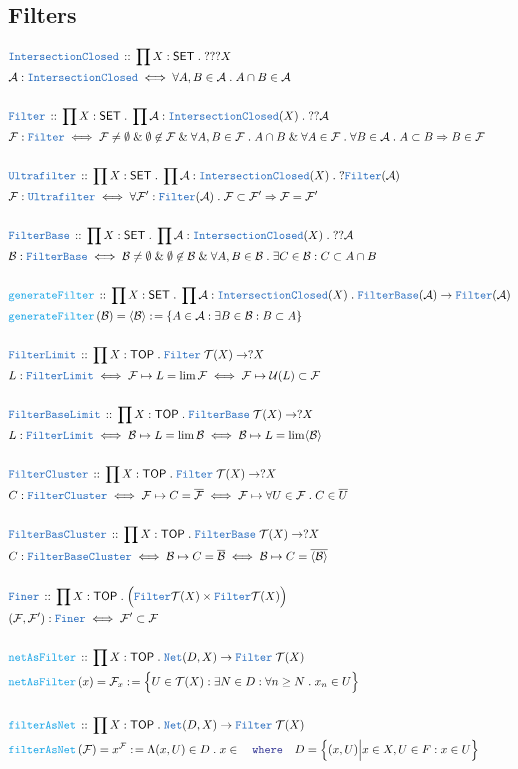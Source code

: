 \documentclass[12pt]{scrartcl}
\newcommand{\TYPE}[1]{\textcolor{NavyBlue}{\mathtt{#1}}}
\newcommand{\FUNC}[1]{\textcolor{Cerulean}{\mathtt{#1}}}
\newcommand{\LOGIC}[1]{\textcolor{Blue}{\mathtt{#1}}}
\renewcommand{\.}{\; . \;}
\newcommand{\de}{: \kern 0.1pc =}
\newcommand{\where}{\LOGIC{where}}
\newcommand{\Act}[1]{\left( #1 \right)}
\newcommand{\DeclareType}[2]{& \TYPE{#1} \, :: \, #2 \\}
\newcommand{\DefineType}[3]{& #1 : \TYPE{#2} \iff #3 \\}
\newcommand{\DefineNamedType}[4]{& #1 : \TYPE{#2} \iff #3 \iff #4 \\}
\newcommand{\DeclareFunc}[2]{& \FUNC{#1} \, :: \, #2 \\}
\newcommand{\DefineNamedFunc}[4]{&  \FUNC{#1}\Act{#2} = #3 \de #4 \\}
\newcommand{\Page}[1]{ \begin{align*} #1 \end{align*}   }
\renewcommand{\And}{\; \& \;}
\newcommand{\Imply}{\Rightarrow}
\newcommand{\A}{\mathcal{A}}
\newcommand{\B}{\mathcal{B}}
\newcommand{\SET}{\mathsf{SET}}
\newcommand{\TOP}{\mathsf{TOP}}
\newcommand{\T}{\mathcal{T}}
\newcommand{\U}{\mathcal{U}}
\newcommand{\F}{\mathcal{F}}
\begin{document}
\subsection{Filters}
\Page{
	\DeclareType{IntersectionClosed}{\prod X : \SET \. ???X}
	\DefineType{\A}{IntersectionClosed}{\forall A,B \in \A \. A \cap B \in \A}
	\\
	\DeclareType{Filter}{\prod X : \SET \. \prod \A : \TYPE{IntersectionClosed}(X) \. ??\A}
	\DefineType{\F}{Filter}{
		\F \neq \emptyset \And 
		\emptyset \not\in \F \And 
		\forall A,B \in \F \. A \cap B \And
		\forall A \in \F \. \forall B \in \A \. A \subset B \Imply B \in \F
	}
	\\
	\DeclareType{Ultrafilter}{\prod X : \SET \. \prod \A : \TYPE{IntersectionClosed}(X) \. ?\TYPE{Filter}(\A)}
	\DefineType{\F}{Ultrafilter}{
		\forall \F' : \TYPE{Filter}(\A) \.  \F \subset \F'  \Imply \F = \F'
	}
	\\
	\DeclareType{FilterBase}{\prod X : \SET \. \prod \A : \TYPE{IntersectionClosed}(X) \. ??\A}
	\DefineType{\B}{FilterBase}{
		\B  \neq \emptyset \And \emptyset \not \in \B \And \forall A,B \in \B \. \exists C \in \B : C \subset A \cap B
	}
	\\
	\DeclareFunc{generateFilter}{ 
		\prod X : \SET \. 
		\prod \A : \TYPE{IntersectionClosed}(X) \. 
		\TYPE{FilterBase}(\A) \to \TYPE{Filter}(\A) 
	}
	\DefineNamedFunc{generateFilter}{\B }{\langle \B \rangle}
	{
		\{ A \in \A : \exists B \in \B : B \subset A \}
	}
	\\
	\DeclareType{FilterLimit}{\prod X : \TOP \. \TYPE{Filter}\;\T(X) \to ?X}
	\DefineNamedType{L}{FilterLimit}{\F \mapsto  L = \lim \F}
	{ \F \mapsto \U(L) \subset \F }
	\\
	\DeclareType{FilterBaseLimit}{\prod X : \TOP \. \TYPE{FilterBase}\;\T(X) \to ?X}
	\DefineNamedType{L}{FilterLimit}{\B \mapsto  L = \lim \B}
	{ \B \mapsto L = \lim \langle \B \rangle  }
	\\
	\DeclareType{FilterCluster}{\prod X : \TOP \. \TYPE{Filter}\;\T(X) \to ?X}
	\DefineNamedType{C}{FilterCluster}{\F \mapsto  C= \overline{\F}}
	{ \F \mapsto \forall U \in \F \. C \in \overline{U} }
	\\
	\DeclareType{FilterBasCluster}{\prod X : \TOP \. \TYPE{FilterBase}\;\T(X) \to ?X}
	\DefineNamedType{C}{FilterBaseCluster}{\B \mapsto  C = \overline{\B}}
	{ \B \mapsto C = \overline{\langle \B \rangle} }
	\\
	\DeclareType{Finer}{\prod X : \TOP \. \Big( \TYPE{Filter} \T(X) \times \TYPE{Filter} \T(X)  \Big)}
	\DefineType{(\F,\F')}{Finer}{\F' \subset \F}
	\\
	\DeclareFunc{netAsFilter}
	{
		\prod X : \TOP \. \TYPE{Net}(D,X) \to \TYPE{Filter}\; \T(X)
	}
	\DefineNamedFunc{netAsFilter}{x}{\F_x}
	{
		\Big\{  U \in \T(X) : \exists N \in D : \forall n \ge N \. x_n \in U  \Big\}
	} 
	\\
	\DeclareFunc{filterAsNet}
	{
		\prod X : \TOP \. \TYPE{Net}(D,X) \to \TYPE{Filter}\; \T(X)
	}
	\DefineNamedFunc{filterAsNet}{\F}{x^\F}
	{
		\Lambda (x,U) \in D \. x \in  
		\quad 
		\where 
		\quad
		D = \Big\{ (x,U) \Big| x \in X , U \in F : x \in U \Big\}
	} 
}
\end{document}
